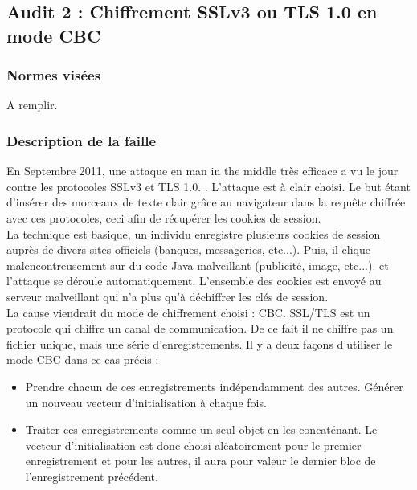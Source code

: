 	\subsection{Audit 2 : Chiffrement SSLv3 ou TLS 1.0 en mode CBC}
		\subsubsection{Normes visées}
	
			A remplir.	
	
		\subsubsection{Description de la faille}
			
			En Septembre 2011, une attaque en man in the middle très efficace a vu le jour contre les protocoles SSLv3 et TLS 1.0. \cite{ekr2011beast} \cite{imperial2011beast} \cite{goodin2011beast} \cite{gallagher2011beast}. L'attaque est à clair choisi. Le but étant d'insérer des morceaux de texte clair grâce au navigateur dans la requête chiffrée avec ces protocoles, ceci afin de récupérer les cookies de session.\\
			
			La technique est basique, un individu enregistre plusieurs cookies de session auprès de divers sites officiels (banques, messageries, etc...). Puis, il clique malencontreusement sur du code Java malveillant (publicité, image, etc...). et l'attaque se déroule automatiquement. L'ensemble des cookies est envoyé au serveur malveillant qui n'a plus qu'à déchiffrer les clés de session.\\
			
			La cause viendrait du mode de chiffrement choisi : CBC. 	SSL/TLS est un protocole qui chiffre un canal de communication.	De ce fait il ne chiffre pas un fichier unique, mais une série d'enregistrements.	Il y a deux façons d'utiliser le mode CBC dans ce cas précis :
			\begin{itemize}
			\item Prendre chacun de ces enregistrements indépendamment des autres. Générer un nouveau vecteur d'initialisation à chaque fois.
			\item Traiter ces enregistrements comme un seul objet en les concaténant. Le vecteur d'initialisation est donc choisi aléatoirement pour le premier enregistrement et pour les autres, il aura pour valeur le dernier bloc de l'enregistrement précédent.\\
			
			\end{itemize}
			
